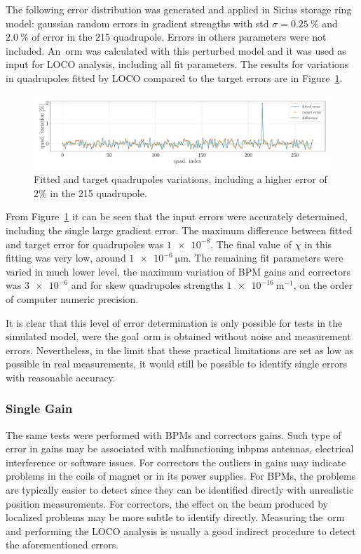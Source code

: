 The following error distribution was generated and applied in Sirius storage ring model: gaussian random errors in gradient strengths with std $\sigma=\SI{0.25}{\%}$ and $\SI{2.0}{\%}$ of error in the 215 quadrupole. Errors in others parameters were not included. An~\gls{orm} was calculated with this perturbed model and it was used as input for LOCO analysis, including all fit parameters. The results for variations in quadrupoles fitted by LOCO compared to the target errors are in Figure~\ref{fig:single_quad_detec}.
\begin{figure}
\centering
\includegraphics[width=1.0\textwidth]{figures/single_quaderror_detection_big.pdf}
\caption{Fitted and target quadrupoles variations, including a higher error of 2\% in the 215 quadrupole.}
\label{fig:single_quad_detec}
\end{figure}

From Figure~\ref{fig:single_quad_detec} it can be seen that the input errors were accurately determined, including the single large gradient error. The maximum difference between fitted and target error for quadrupoles was $\num{1e-8}$. The final value of $\chi$ in this fitting was very low, around $\SI{1e-6}{\micro\meter}$. The remaining fit parameters were varied in much lower level, the maximum variation of BPM gains and correctors was $\num{3e-6}$ and for skew quadrupoles strengths $\SI{1e-16}{\meter^{-1}}$, on the order of computer numeric precision.

It is clear that this level of error determination is only possible for tests in the simulated model, were the goal~\gls{orm} is obtained without noise and measurement errors. Nevertheless, in the limit that these practical limitations are set as low as possible in real measurements, it would still be possible to identify single errors with reasonable accuracy.
\subsubsection{Single Gain}
The same tests were performed with BPMs and correctors gains. Such type of error in gains may be associated with malfunctioning in\glspl{bpm} antennas, electrical interference or software issues. For correctors the outliers in gains may indicate problems in the coils of magnet or in its power supplies. For BPMs, the problems are typically easier to detect since they can be identified directly with unrealistic position measurements. For correctors, the effect on the beam produced by localized problems may be more subtle to identify directly. Measuring the~\gls{orm} and performing the LOCO analysis is usually a good indirect procedure to detect the aforementioned errors.

